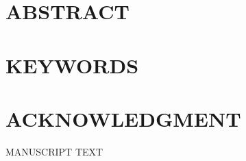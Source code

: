 \documentclass[12pt,english]{article}
\begin{document}
\clearpage 

\doublespacing
\section*{ABSTRACT}
\PAPERABSTRACT
\clearpage 

\doublespacing
\section*{KEYWORDS}
\PAPERKEYWORDS
\clearpage 

\doublespacing
\section*{ACKNOWLEDGMENT}
\ACKNOWLEDGMENTS
\clearpage 

\setcounter{page}{1}
\renewcommand*{\thefootnote}{\arabic{footnote}}
\begingroup
  \centering
  \Large MANUSCRIPT TEXT\\[1em]
\endgroup


\pagebreak
\begingroup
{}
\setlength\bibitemsep{5.0pt}
\printbibliography[title=References for Manuscript]
\endgroup
\pagebreak



\clearpage 
\newpage

\appendix
\begin{refsection}

\setcounter{page}{1}
\end{refsection}
\end{document}
